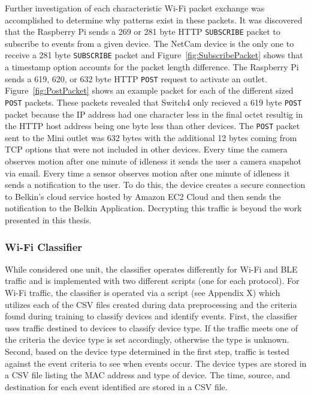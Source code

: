 \documentclass[12pt,letterpaper,oneside]{book}
\begin{document}
			Further investigation of each characteristic Wi-Fi packet exchange was accomplished to determine why patterns exist in these packets. It was discovered that the Raspberry Pi sends a 269 or 281 byte \ac{HTTP} \texttt{SUBSCRIBE} packet to subscribe to events from a given device. The NetCam device is the only one to receive a 281 byte \texttt{SUBSCRIBE} packet and Figure~\ref{fig:SubscribePacket} shows that a timestamp option accounts for the packet length difference. The Raspberry Pi sends a 619, 620, or 632 byte \ac{HTTP} \texttt{POST} request to activate an outlet. Figure~\ref{fig:PostPacket} shows an example packet for each of the different sized \texttt{POST} packets. These packets revealed that Switch4 only recieved a 619 byte \texttt{POST} packet because the \ac{IP} address had one character less in the final octet resultig in the \ac{HTTP} host address being one byte less than other devices. The \texttt{POST} packet sent to the Mini outlet was 632 bytes with the additional 12 bytes coming from \ac{TCP} options that were not included in other devices. Every time the camera observes motion after one minute of idleness it sends the user a camera snapshot via email. Every time a sensor observes motion after one minute of idleness it sends a notification to the user. To do this, the device creates a secure connection to Belkin's cloud service hosted by Amazon EC2 Cloud and then sends the notification to the Belkin Application. Decrypting this traffic is beyond the work presented in this thesis.
			
			\figSubscribePacket
			\figPostPacket
			
			\subsubsection{Wi-Fi Classifier}
			While considered one unit, the classifier operates differently for Wi-Fi and \ac{BLE} traffic and is implemented with two different scripts (one for each protocol). For Wi-Fi traffic, the classifier is operated via a script (see Appendix X) which utilizes each of the \ac{CSV} files created during data preprocessing and the criteria found during training to classify devices and identify events. First, the classifier uses traffic destined to devices to classify device type. If the traffic meets one of the criteria the device type is set accordingly, otherwise the type is unknown. Second, based on the device type determined in the first step, traffic is tested against the event criteria to see when events occur. The device types are stored in a \ac{CSV} file listing the \ac{MAC} address and type of device. The time, source, and destination for each event identified are stored in a \ac{CSV} file.
			
\end{document}
